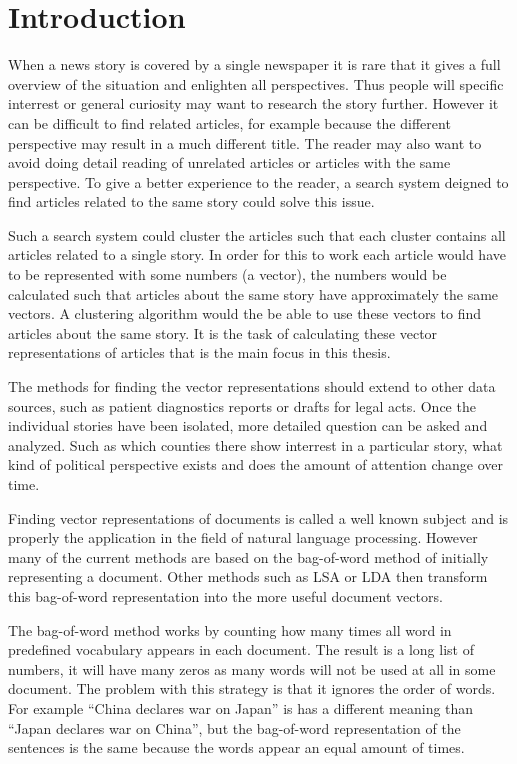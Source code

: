 \chapter{Introduction}

When a news story is covered by a single newspaper it is rare that it gives a full overview of the situation and enlighten all perspectives. Thus people will specific interrest or general curiosity may want to research the story further. However it can be difficult to find related articles, for example because the different perspective may result in a much different title. The reader may also want to avoid doing detail reading of unrelated articles or articles with the same perspective. To give a better experience to the reader, a search system deigned to find articles related to the same story could solve this issue.

Such a search system could cluster the articles such that each cluster contains all articles related to a single story. In order for this to work each article would have to be represented with some numbers (a vector), the numbers would be calculated such that articles about the same story have approximately the same vectors. A clustering algorithm would the be able to use these vectors to find articles about the same story. It is the task of calculating these vector representations of articles that is the main focus in this thesis.

The methods for finding the vector representations should extend to other data sources, such as patient diagnostics reports or drafts for legal acts.
Once the individual stories have been isolated, more detailed question can be asked and analyzed. Such as which counties there show interrest in a particular story, what kind of political perspective exists and does the amount of attention change over time. 

Finding vector representations of documents is called a well known subject and is properly the application in the field of natural language processing. However many of the current methods are based on the bag-of-word method of initially representing a document. Other methods such as LSA or LDA then transform this bag-of-word representation into the more useful document vectors.

The bag-of-word method works by counting how many times all word in predefined vocabulary appears in each document. The result is a long list of numbers, it will have many zeros as many words will not be used at all in some document. The problem with this strategy is that it ignores the order of words. For example ``China declares war on Japan'' is has a different meaning than ``Japan declares war on China'', but the bag-of-word representation of the sentences is the same because the words appear an equal amount of times.

